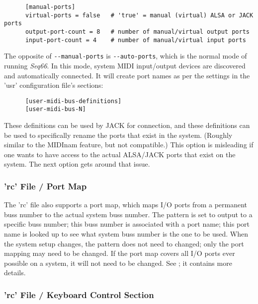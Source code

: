    \begin{verbatim}
      [manual-ports]
      virtual-ports = false   # 'true' = manual (virtual) ALSA or JACK ports
      output-port-count = 8   # number of manual/virtual output ports
      input-port-count = 4    # number of manual/virtual input ports
   \end{verbatim}

   The opposite of \texttt{-{}-manual-ports} is \texttt{-{}-auto-ports},
   which is the normal mode of running \textsl{Seq66}.
   In this mode, system MIDI input/output devices are discovered and
   automatically connected.
   It will create port names as per the settings in the 'usr' configuration
   file's sections:

   \begin{verbatim}
      [user-midi-bus-definitions]
      [user-midi-bus-N]
   \end{verbatim}

   These definitions can be used by JACK for connection, and these
   definitions can be used to specifically rename the ports that exist in the
   system. (Roughly similar to the MIDInam feature, but not compatible.)
   This option is misleading if one wants to have access to the
   actual ALSA/JACK ports that exist on the system.
   The next option gets around that issue.

\subsubsection{'rc' File / Port Map}
\label{subsubsec:configuration_rc_port_map}

   The 'rc' file also supports a port map, which maps I/O ports from a
   permanent buss number to the actual system buss number.
   The pattern is set to output to a specific buss number; this buss number is
   associated with a port name; this port name is looked up to see what
   system buss number is the one to be used.  When the system setup changes,
   the pattern does not need to changed; only the port mapping may need to be
   changed.  If the port map covers all I/O ports ever possible on a system, it
   will not need to be changed.  See ; it contains
   more details.

\subsubsection{'rc' File / Keyboard Control Section}
\label{subsubsec:configuration_rc_keyboard_control}

